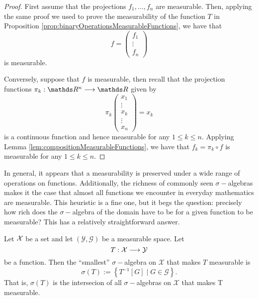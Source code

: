 \begin{proof}
First assume that the projections $f_{1},\ldots,f_{n}$ are measurable.
Then, applying the same proof we used to prove the measurability of
the function $T$ in Proposition \ref{prop:binaryOperationsMeasurableFunctions},
we have that
\[
f=\left(\begin{array}{c}
f_{1}\\
\vdots\\
f_{n}
\end{array}\right)
\]
is measurable.

Conversely, suppose that $f$ is measurable, then recall that the
projection functions $\pi_{k}:\R^{n}\longrightarrow\R$ given by
\[
\pi_{k}\left(\begin{array}{c}
x_{1}\\
\vdots\\
x_{k}\\
\vdots\\
x_{n}
\end{array}\right)=x_{k}
\]
is a continuous function and hence measurable for any $1\leq k\leq n$.
Applying Lemma \ref{lem:compositionMeasurableFunctions}, we have
that $f_{k}=\pi_{k}\circ f$ is measurable for any $1\leq k\leq n.$
\end{proof}
In general, it appears that a measurability is preserved under a wide
range of operations on functions. Additionally, the richness of commonly
seen $\sigma-$algebras makes it the case that almost all functions
we encounter in everyday mathematics are measurable. This heuristic
is a fine one, but it begs the question: precisely how rich does the
$\sigma-$algebra of the domain have to be for a given function to
be measurable? This has a relatively straightforward answer.
\begin{prop}
\label{prop:sigmaAlgebraGeneratedByFunction}Let $\mathcal{X}$ be a set and
let $\left(\mathcal{Y},\mathcal{G}\right)$ be a measurable space.
Let
\[
T:\mathcal{X}\longrightarrow\mathcal{Y}
\]
be a function. Then the ``smallest'' $\sigma-$algebra on $\mathcal{X}$
that makes $T$ measurable is 
\[
\sigma\left(T\right):=\left\{ T^{-1}\left[G\right]\mid G\in\mathcal{G}\right\} .
\]
That is, $\sigma\left(T\right)$ is the intersecion of all $\sigma-$algebras
on $\mathcal{X}$ that makes T measurable.
\end{prop}

